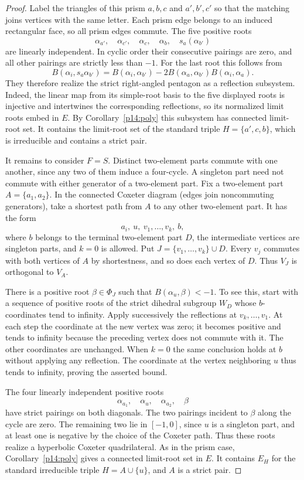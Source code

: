 \documentclass[11pt,reqno]{amsart}
\theoremstyle{plain}
\theoremstyle{definition}
\theoremstyle{remark}
\numberwithin{equation}{section}
\begin{document}
\begin{proof}
Label the triangles of this prism $a,b,c$ and $a',b',c'$ so that
the matching joins vertices with the same letter. Each prism edge
belongs to an induced rectangular face, so all prism edges commute.
The five positive roots
\[
       \alpha_{a'},\quad \alpha_{c'},\quad \alpha_c,\quad
       \alpha_b,\quad s_a(\alpha_{b'})
\]
are linearly independent. In cyclic order their consecutive
pairings are zero, and all other pairings are strictly less
than $-1$. For the last root this follows from
\[
 B(\alpha_i,s_a\alpha_{b'})
 =B(\alpha_i,\alpha_{b'})
    -2B(\alpha_a,\alpha_{b'})B(\alpha_i,\alpha_a).
\]
They therefore realize the strict right-angled pentagon as a
reflection subsystem. Indeed, the linear map from its simple-root
basis to the five displayed roots is injective and intertwines
the corresponding reflections, so its normalized limit roots
embed in $E$. By Corollary~\ref{p14:poly} this subsystem has connected
limit-root set. It contains the limit-root set of the standard
triple $H=\{a',c,b\}$, which is irreducible and contains a strict
pair.

It remains to consider $F=S$. Distinct two-element parts commute
with one another, since any two of them induce a four-cycle.
A singleton part need not commute with either generator of a
two-element part. Fix a two-element part $A=\{a_1,a_2\}$.
In the connected Coxeter diagram (edges join noncommuting
generators), take a shortest path from $A$ to any other
two-element part. It has the form
\[
             a_i,\ u,\ v_1,\ldots,v_k,\ b ,
\]
where $b$ belongs to the terminal two-element part $D$,
the intermediate vertices are singleton parts, and $k=0$
is allowed. Put $J=\{v_1,\ldots,v_k\}\cup D$. Every
$v_j$ commutes with both vertices of $A$ by shortestness,
and so does each vertex of $D$. Thus $V_J$ is orthogonal to
$V_A$.

There is a positive root $\beta\in\Phi_J$ such that
$B(\alpha_u,\beta)<-1$. To see this, start with a sequence of
positive roots of the strict dihedral subgroup $W_D$ whose
$b$-coordinates tend to infinity. Apply successively the
reflections at $v_k,\ldots,v_1$. At each step the coordinate
at the new vertex was zero; it becomes positive and tends to
infinity because the preceding vertex does not commute with it.
The other coordinates are unchanged. When $k=0$ the same
conclusion holds at $b$ without applying any reflection.
The coordinate at the vertex neighboring $u$ thus tends to
infinity, proving the asserted bound.

The four linearly independent positive roots
\[
            \alpha_{a_1},\quad\alpha_u,\quad
            \alpha_{a_2},\quad\beta
\]
have strict pairings on both diagonals. The two pairings incident
to $\beta$ along the cycle are zero. The remaining two lie in
$[-1,0]$, since $u$ is a singleton part, and at least one is
negative by the choice of the Coxeter path. Thus these roots
realize a hyperbolic Coxeter quadrilateral. As in the prism case,
Corollary~\ref{p14:poly} gives a connected limit-root set in $E$.
It contains $E_H$ for the standard irreducible triple
$H=A\cup\{u\}$, and $A$ is a strict pair.
\end{proof}
\end{document}
